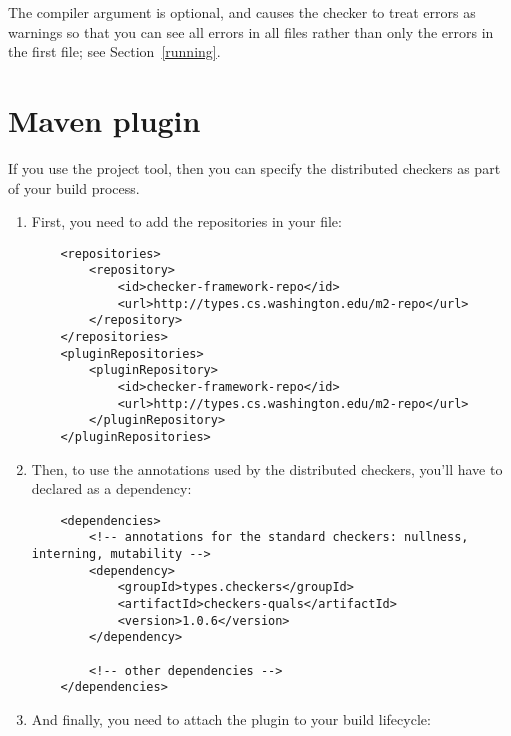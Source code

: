 The  compiler argument is optional, and causes the checker to
treat errors as warnings so that you can see all errors in all files rather
than only the errors in the first file; see Section~\ref{running}.


\section{Maven plugin\label{maven-plugin}}

If you use the  project tool,
then you can specify the distributed checkers as part of your build
process.

\begin{enumerate}

\item First, you need to add the repositories in your  file:

\begin{Verbatim}
    <repositories>  
        <repository>  
            <id>checker-framework-repo</id>  
            <url>http://types.cs.washington.edu/m2-repo</url>  
        </repository>  
    </repositories>  
    <pluginRepositories>  
        <pluginRepository>  
            <id>checker-framework-repo</id>  
            <url>http://types.cs.washington.edu/m2-repo</url>  
        </pluginRepository>  
    </pluginRepositories>
\end{Verbatim}

\item Then, to use the annotations used by the distributed checkers, you'll
have to declared as a dependency:

\begin{Verbatim}
    <dependencies>  
        <!-- annotations for the standard checkers: nullness, interning, mutability -->  
        <dependency>  
            <groupId>types.checkers</groupId>  
            <artifactId>checkers-quals</artifactId>  
            <version>1.0.6</version>  
        </dependency>  

        <!-- other dependencies -->  
    </dependencies>
\end{Verbatim}

\item And finally, you need to attach the plugin to your build lifecycle:


\end{enumerate}
